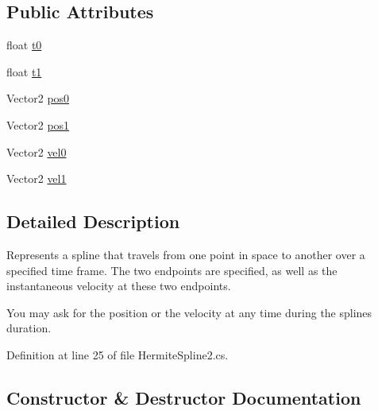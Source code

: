 \subsection*{Public Attributes}
\begin{DoxyCompactItemize}
\item 
float \mbox{\hyperlink{struct_leap_1_1_unity_1_1_animation_1_1_hermite_spline2_abeb145d4108689c6f4fcb55ced2d6639}{t0}}
\item 
float \mbox{\hyperlink{struct_leap_1_1_unity_1_1_animation_1_1_hermite_spline2_af8478246aa4cce249769aba7f45f4e10}{t1}}
\item 
Vector2 \mbox{\hyperlink{struct_leap_1_1_unity_1_1_animation_1_1_hermite_spline2_a34b8ac4e587d68ca8a12eb4bd0b49173}{pos0}}
\item 
Vector2 \mbox{\hyperlink{struct_leap_1_1_unity_1_1_animation_1_1_hermite_spline2_a208182486711483ef684285a1df65fc7}{pos1}}
\item 
Vector2 \mbox{\hyperlink{struct_leap_1_1_unity_1_1_animation_1_1_hermite_spline2_a14cb5f29c619abcd0cb6d11ba3fb6b40}{vel0}}
\item 
Vector2 \mbox{\hyperlink{struct_leap_1_1_unity_1_1_animation_1_1_hermite_spline2_a430d3b4dfb7c08fbaff770671eb42eb4}{vel1}}
\end{DoxyCompactItemize}


\subsection{Detailed Description}
Represents a spline that travels from one point in space to another over a specified time frame. The two endpoints are specified, as well as the instantaneous velocity at these two endpoints. 

You may ask for the position or the velocity at any time during the splines duration. 

Definition at line 25 of file Hermite\+Spline2.\+cs.



\subsection{Constructor \& Destructor Documentation}
\mbox{\label{struct_leap_1_1_unity_1_1_animation_1_1_hermite_spline2_af2e4cf32921a5a73855a36d6fa562567}} 
